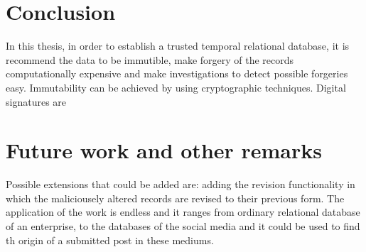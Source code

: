 	\section{Conclusion}
	In this thesis, in order to establish a trusted temporal relational database, it is recommend the data to be immutible, make forgery of the records computationally expensive and make investigations to detect possible forgeries easy. Immutability can be achieved by using cryptographic techniques. Digital signatures are 

	\section{Future work and other remarks}
		Possible extensions that could be added are: adding the revision functionality in which the maliciousely altered records are revised to their previous form. The application of the work is endless and it ranges from ordinary relational database of an enterprise, to the databases of the social media and it could be used to find th origin of a submitted post in these mediums.